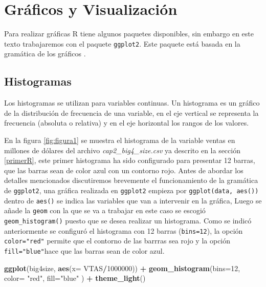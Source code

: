 \documentclass[]{book}
\newenvironment{Shaded}{\begin{snugshade}}{\end{snugshade}}
\newcommand{\DataTypeTok}[1]{\textcolor[rgb]{0.13,0.29,0.53}{#1}}
\newcommand{\DecValTok}[1]{\textcolor[rgb]{0.00,0.00,0.81}{#1}}
\newcommand{\KeywordTok}[1]{\textcolor[rgb]{0.13,0.29,0.53}{\textbf{#1}}}
\newcommand{\NormalTok}[1]{#1}
\newcommand{\OperatorTok}[1]{\textcolor[rgb]{0.81,0.36,0.00}{\textbf{#1}}}
\newcommand{\StringTok}[1]{\textcolor[rgb]{0.31,0.60,0.02}{#1}}
\begin{document}
\hypertarget{graficos-y-visualizacion}{%
\section{Gráficos y Visualización}\label{graficos-y-visualizacion}}

Para realizar gráficas R tiene algunos paquetes disponibles, sin embargo en este texto trabajaremos con el paquete \texttt{ggplot2}. Este paquete está basada en la gramática de los gráficos \citep{wilkinson2005}.

\hypertarget{histogramas}{%
\subsection{Histogramas}\label{histogramas}}

Los histogramas se utilizan para variables continuas. Un histograma es un gráfico de la distribución de frecuencia de una variable, en el eje vertical se representa la frecuencia (absoluta o relativa) y en el eje horizontal los rangos de los valores.

En la figura \ref{fig:figura1} se muestra el histograma de la variable ventas en millones de dólares del archivo \emph{cap2\_big4\_size.csv} ya descrito en la sección \ref{primerR}, este primer histograma ha sido configurado para presentar 12 barras, que las barras sean de color azul con un contorno rojo. Antes de abordar los detalles mencionados discutiremos brevemente el funcionamiento de la gramática de \texttt{ggplot2}, una gráfica realizada en \texttt{ggplot2} empieza por \texttt{ggplot(data,\ aes())} dentro de \texttt{aes()} se indica las variables que van a intervenir en la gráfica, Luego se añade la \texttt{geom} con la que se va a trabajar en este caso se escogió \texttt{geom\_histogram()} puesto que se desea realizar un histograma. Como se indicó anteriormente se configuró el histograma con 12 barras (\texttt{bins=12}), la opción \texttt{color="red"} permite que el contorno de las barrras sea rojo y la opción \texttt{fill="blue"}hace que las barras sean de color azul.

\begin{Shaded}
\begin{Highlighting}[]
\KeywordTok{ggplot}\NormalTok{(big4size, }\KeywordTok{aes}\NormalTok{(}\DataTypeTok{x=}\NormalTok{ VTAS}\OperatorTok{/}\DecValTok{1000000}\NormalTok{)) }\OperatorTok{+}\StringTok{ }
\StringTok{  }\KeywordTok{geom_histogram}\NormalTok{(}\DataTypeTok{bins=}\DecValTok{12}\NormalTok{, }\DataTypeTok{color=} \StringTok{"red"}\NormalTok{, }\DataTypeTok{fill=}\StringTok{"blue"}\NormalTok{ ) }\OperatorTok{+}\StringTok{ }
\StringTok{  }\KeywordTok{theme_light}\NormalTok{()}
\end{Highlighting}
\end{Shaded}
\end{document}
